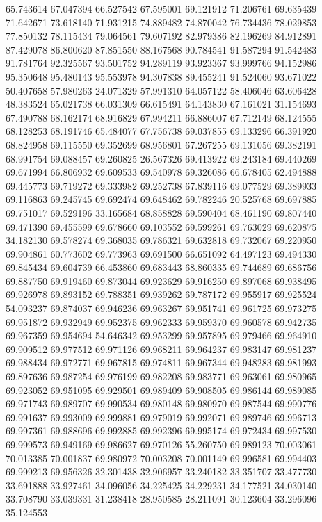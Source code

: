 65.743614
67.047394
66.527542
67.595001
69.121912
71.206761
69.635439
71.642671
73.618140
71.931215
74.889482
74.870042
76.734436
78.029853
77.850132
78.115434
79.064561
79.607192
82.979386
82.196269
84.912891
87.429078
86.800620
87.851550
88.167568
90.784541
91.587294
91.542483
91.781764
92.325567
93.501752
94.289119
93.923367
93.999766
94.152986
95.350648
95.480143
95.553978
94.307838
89.455241
91.524060
93.671022
50.407658
57.980263
24.071329
57.991310
64.057122
58.406046
63.606428
48.383524
65.021738
66.031309
66.615491
64.143830
67.161021
31.154693
67.490788
68.162174
68.916829
67.994211
66.886007
67.712149
68.124555
68.128253
68.191746
65.484077
67.756738
69.037855
69.133296
66.391920
68.824958
69.115550
69.352699
68.956801
67.267255
69.131056
69.382191
68.991754
69.088457
69.260825
26.567326
69.413922
69.243184
69.440269
69.671994
66.806932
69.609533
69.540978
69.326086
66.678405
62.494888
69.445773
69.719272
69.333982
69.252738
67.839116
69.077529
69.389933
69.116863
69.245745
69.692474
69.648462
69.782246
20.525768
69.697885
69.751017
69.529196
33.165684
68.858828
69.590404
68.461190
69.807440
69.471390
69.455599
69.678660
69.103552
69.599261
69.763029
69.620875
34.182130
69.578274
69.368035
69.786321
69.632818
69.732067
69.220950
69.904861
60.773602
69.773963
69.691500
66.651092
64.497123
69.494330
69.845434
69.604739
66.453860
69.683443
68.860335
69.744689
69.686756
69.887750
69.919460
69.873044
69.923629
69.916250
69.897068
69.938495
69.926978
69.893152
69.788351
69.939262
69.787172
69.955917
69.925524
54.093237
69.874037
69.946236
69.963267
69.951741
69.961725
69.973275
69.951872
69.932949
69.952375
69.962333
69.959370
69.960578
69.942735
69.967359
69.954694
54.646342
69.953299
69.957895
69.979466
69.964910
69.909512
69.977512
69.971126
69.968211
69.964237
69.983147
69.981237
69.988434
69.972771
69.967815
69.974811
69.967344
69.948283
69.981993
69.897636
69.987254
69.976199
69.982208
69.983771
69.963061
69.980965
69.923052
69.951095
69.929501
69.989409
69.908505
69.986144
69.989085
69.971743
69.989707
69.990534
69.980148
69.980970
69.987544
69.990776
69.991637
69.993009
69.999881
69.979019
69.992071
69.989746
69.996713
69.997361
69.988696
69.992885
69.992396
69.995174
69.972434
69.997530
69.999573
69.949169
69.986627
69.970126
55.260750
69.989123
70.003061
70.013385
70.001837
69.980972
70.003208
70.001149
69.996581
69.994403
69.999213
69.956326
32.301438
32.906957
33.240182
33.351707
33.477730
33.691888
33.927461
34.096056
34.225425
34.229231
34.177521
34.030140
33.708790
33.039331
31.238418
28.950585
28.211091
30.123604
33.296096
35.124553
